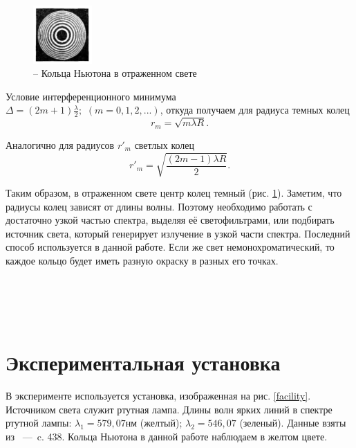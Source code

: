 \documentclass[a4paper,12pt]{article}
\theoremstyle{plain} %
\theoremstyle{definition} %
\theoremstyle{remark} %
\begin{document}
\begin{figure}
	\begin{center}
		\includegraphics[width=0.2\textwidth,scale=0.2]{circles.png}
		\caption{-- Кольца Ньютона в отраженном свете \cite{Kirichenko}}
		\label{circles}
	\end{center}
\end{figure}

Условие интерференционного минимума \\ $\Delta=(2m+1)\frac{\lambda}{2};$ $(m=0,1,2,...)$, откуда получаем для радиуса темных колец
\begin{equation}
	r_m=\sqrt{m\lambda R}.
	\label{dark_lines}
\end{equation}

Аналогично для радиусов $r'_m$ светлых колец
\begin{equation}
	r'_m = \sqrt{\frac{(2m-1)\lambda R}{2}}.
	\label{bright_lines}
\end{equation}


Таким образом, в отраженном свете центр колец темный (рис. \ref{circles}).
Заметим, что радиусы колец зависят от длины волны. Поэтому необходимо работать с достаточно узкой частью спектра, выделяя её светофильтрами, или подбирать источник света, который генерирует излучение в узкой части спектра. Последний способ используется в данной работе. Если же свет немонохроматический, то каждое кольцо будет иметь разную окраску в разных его точках. 
\\
\\
\\
\\
\\


\newpage
\section{Экспериментальная установка}

В эксперименте используется установка, изображенная на рис. \ref{facility}. Источником света служит ртутная лампа. Длины волн ярких линий в спектре ртутной лампы: 
$\lambda_1 = 579,07 нм$ (желтый);   $\lambda_2 = 546,07$ (зеленый). Данные взяты из \cite{PrakOptics}~---~c. 438. Кольца Ньютона в данной работе наблюдаем в желтом цвете.
\end{document}

